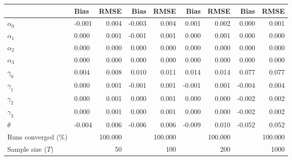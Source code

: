 
\begin{tabular}[t]{llrrrrrrr}
\toprule
  & Bias & RMSE & Bias & RMSE & Bias & RMSE & Bias & RMSE\\
\midrule
$\alpha_{0}$ & -0.001 & 0.004 & -0.003 & 0.004 & 0.001 & 0.002 & 0.000 & 0.001\\
$\alpha_{1}$ & 0.000 & 0.001 & -0.001 & 0.001 & 0.000 & 0.001 & 0.000 & 0.000\\
$\alpha_{2}$ & 0.000 & 0.000 & 0.000 & 0.000 & 0.000 & 0.000 & 0.000 & 0.000\\
$\alpha_{3}$ & 0.000 & 0.000 & 0.000 & 0.000 & 0.000 & 0.000 & 0.000 & 0.000\\
$\gamma_{0}$ & 0.004 & 0.008 & 0.010 & 0.011 & 0.014 & 0.014 & 0.077 & 0.077\\
$\gamma_{1}$ & 0.000 & 0.001 & -0.001 & 0.001 & -0.001 & 0.001 & -0.004 & 0.004\\
$\gamma_{2}$ & 0.000 & 0.001 & 0.000 & 0.001 & 0.000 & 0.000 & -0.002 & 0.002\\
$\gamma_{3}$ & 0.000 & 0.001 & 0.000 & 0.001 & 0.000 & 0.000 & -0.002 & 0.002\\
$\theta$ & -0.004 & 0.006 & -0.006 & 0.006 & -0.009 & 0.010 & -0.052 & 0.052\\
Runs converged (\%) &  & 100.000 &  & 100.000 &  & 100.000 &  & 100.000\\
Sample size ($T$) &  & 50 &  & 100 &  & 200 &  & 1000\\
\bottomrule
\end{tabular}
